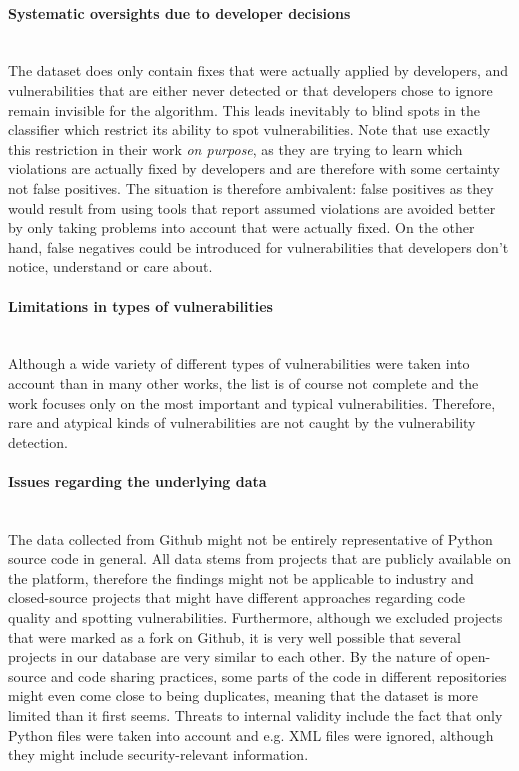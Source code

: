 \documentclass[
a4paper,
pagesize,
pdftex,
12pt,
twoside, %
BCOR=5mm, %
ngerman,
fleqn,
final,
]{scrartcl}
\begin{document}
	\paragraph{Systematic oversights due to developer decisions}\mbox{}\\
	The dataset does only contain fixes that were actually applied by developers, and vulnerabilities that are either never detected or that developers chose to ignore remain invisible for the algorithm. This leads inevitably to blind spots in the classifier which restrict its ability to spot vulnerabilities. Note that \cite{Liu.2018} use exactly this restriction in their work \textit{on purpose}, as they are trying to learn which violations are actually fixed by developers and are therefore with some certainty  not false positives. The situation is therefore ambivalent: false positives as they would result from using tools that report assumed violations are avoided better by only taking problems into account that were actually fixed. On the other hand, false negatives could be introduced for vulnerabilities that developers don't notice, understand or care about.
	\paragraph{Limitations in types of vulnerabilities}\mbox{}\\
	Although a wide variety of different types of vulnerabilities were taken into account than in many other works, the list is of course not complete and the work focuses only on the most important and typical vulnerabilities. Therefore, rare and atypical kinds of vulnerabilities are not caught by the vulnerability detection.
	\paragraph{Issues regarding the underlying data}\mbox{}\\
	The data collected from Github might not be entirely representative of Python source code in general. All data stems from projects that are publicly available on the platform, therefore the findings might not be applicable to industry and closed-source projects that might have different approaches regarding code quality and spotting vulnerabilities. Furthermore, although we excluded projects that were marked as a fork on Github, it is very well possible that several projects in our database are very similar to each other. By the nature of open-source and code sharing practices, some parts of the code in different repositories might even come close to being duplicates, meaning that the dataset is more limited than it first seems. Threats to internal validity include the fact that only Python files were taken into account and e.g. XML files were ignored, although they might include security-relevant information. 
\end{document}

